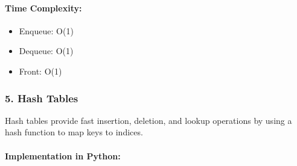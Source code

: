 \hypertarget{time-complexity-3}{%
\paragraph{Time Complexity:}\label{time-complexity-3}}

\begin{itemize}
\tightlist
\item
  Enqueue: O(1)
\item
  Dequeue: O(1)
\item
  Front: O(1)
\end{itemize}

\hypertarget{hash-tables}{%
\subsubsection{5. Hash Tables}\label{hash-tables}}

Hash tables provide fast insertion, deletion, and lookup operations by
using a hash function to map keys to indices.

\hypertarget{implementation-in-python-1}{%
\paragraph{Implementation in Python:}\label{implementation-in-python-1}}

